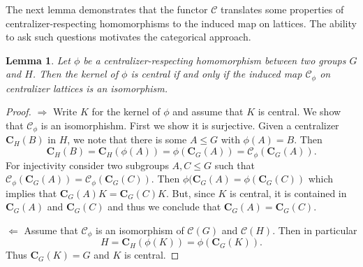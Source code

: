 \documentclass[12pt]{amsart}
\newtheorem{theorem}{Theorem}[section]
\newtheorem{lemma}[theorem]{Lemma}
\begin{document}
    


The next lemma demonstrates that the functor $\mathcal{C}$ translates some properties of centralizer-respecting homomorphisms to the induced map on lattices. The ability to ask such questions motivates the categorical approach. 

\begin{lemma}
    Let $\phi$ be a centralizer-respecting homomorphism between two groups $G$ and $H$. Then the kernel of $\phi$ is central if and only if the induced map $\mathcal{C}_{\phi}$ on centralizer lattices is an isomorphism. 
\end{lemma}
\begin{proof}
   $\Rightarrow$ Write $K$ for the kernel of $\phi$ and assume that $K$ is central. We show that $\mathcal{C}_\phi$ is an isomorphishm. First we show it is surjective. Given a centralizer $\mathbf{C}_H(B)$ in $H$, we note that there is some $A\leq G$ with $\phi(A) = B$. Then \[\mathbf{C}_H(B) = \mathbf{C}_H(\phi(A)) = \phi(\mathbf{C}_G(A))= \mathcal{C}_\phi(\mathbf{C}_G(A)).\] For injectivity consider two subgroups $A,C \leq G$ such that $\mathcal{C}_{\phi}(\mathbf{C}_G(A)) = \mathcal{C}_\phi (\mathbf{C}_G(C))$. Then $\phi(\mathbf{C}_G(A) = \phi(\mathbf{C}_G(C))$ which implies that $\mathbf{C}_G(A) K = \mathbf{C}_G(C) K$. But, since $K$ is central, it is contained in $\mathbf{C}_G(A)$ and $\mathbf{C}_G(C)$ and thus we conclude that $\mathbf{C}_G(A) = \mathbf{C}_G(C)$. 

   $\Leftarrow$ Assume that $\mathcal{C}_\phi$ is an isomorphism of $\mathcal{C}(G)$ and $\mathcal{C}(H)$. Then in particular \[H=\mathbf{C}_H(\phi(K))= \phi(\mathbf{C}_G(K)).\] Thus $\mathbf{C}_G(K) = G$ and $K$ is central.
\end{proof}

\end{document}
